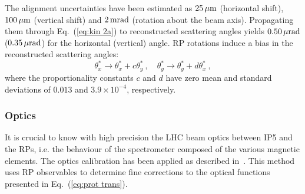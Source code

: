 The alignment uncertainties have been estimated as $25\,{\rm \mu m}$ (horizontal shift), $100\,{\rm \mu m}$ (vertical shift) and $2\,{\rm m rad}$ (rotation about the beam axis). Propagating them through Eq.~(\ref{eq:kin 2a}) to reconstructed scattering angles yields $0.50\,{\rm \mu rad}$ ($0.35\,{\rm \mu rad}$) for the horizontal (vertical) angle. RP rotations induce a bias in the reconstructed scattering angles:
\begin{equation}
\label{eq:alig rot bias}
	\theta_x^* \rightarrow \theta_x^* + c \theta_y^*\ ,\quad
	\theta_y^* \rightarrow \theta_y^* + d \theta_x^*\ ,
\end{equation}
where the proportionality constants $c$ and $d$ have zero mean and standard deviations of $0.013$ and $3.9\times10^{-4}$, respectively.




\subsubsection{Optics}
\label{sec:optics}

It is crucial to know with high precision the LHC beam optics between IP5 and the RPs, i.e. the behaviour of the spectrometer composed of the various magnetic elements. The optics calibration has been applied as described in~\cite{totem-optics}. This method uses RP observables to determine fine corrections to the optical functions presented in Eq.~(\ref{eq:prot trans}).

